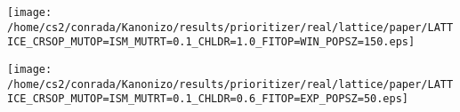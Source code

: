 \documentclass{article}
\begin{document}

\begin{center}
\vspace*{-1.7in}
\hspace*{-3.9in}
\texttt{[image: /home/cs2/conrada/Kanonizo/results/prioritizer/real/lattice/paper/LATTICE\_CRSOP\_MUTOP=ISM\_MUTRT=0.1\_CHLDR=1.0\_FITOP=WIN\_POPSZ=150.eps]} \newpage
\end{center}

\begin{center}
\vspace*{-1.7in}
\hspace*{-3.9in}
\texttt{[image: /home/cs2/conrada/Kanonizo/results/prioritizer/real/lattice/paper/LATTICE\_CRSOP\_MUTOP=ISM\_MUTRT=0.1\_CHLDR=0.6\_FITOP=EXP\_POPSZ=50.eps]} \newpage
\end{center}
\end{document}
